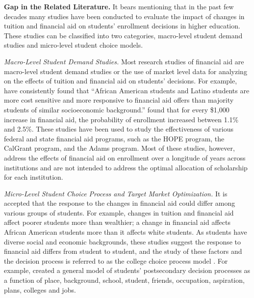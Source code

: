 \documentclass[12pt,english]{report}
\begin{document}

\vspace{0.15in}
\noindent \textbf{Gap in the Related Literature.} 
It bears mentioning that in the past few decades many studies have been conducted to evaluate the impact of changes in tuition and financial aid on students' enrollment decisions in higher education. These studies can be classified into two categories, macro-level student demand studies and micro-level student choice models. 

\vspace{0.1in}
\noindent \textit{Macro-Level Student Demand Studies.} 
Most research studies of financial aid are  macro-level student demand studies or the use of market level data for analyzing on the effects of tuition and financial aid on students' decisions.  For example, \citet{Hossler1989} have consistently found that ``African American students and Latino students are more cost sensitive and more responsive to financial aid offers than majority students of similar socioeconomic background.''  \citet{Braunstein1999} found that for every \$1,000 increase in financial aid, the probability  of  enrollment increased between 1.1\% and 2.5\%.  These studies have been used to study the effectiveness of various federal and state financial aid programs, such as the HOPE program, the CalGrant program, and the Adams program.  Most of these studies, however, address the effects of financial aid on enrollment over a longitude of years across institutions and are not intended to address the optimal  allocation of scholarship for each institution. 

\vspace{0.1in}
\noindent \textit{Micro-Level Student Choice Process and Target Market Optimization.} 
It is accepted that the response to the changes in financial aid could differ among various groups of students. For example, changes in tuition and financial aid affect poorer students more than wealthier; a change in financial aid affects African American students more than it affects white students. As students have diverse social and economic backgrounds, these studies suggest the response to financial aid differs from student to student, and the study of these factors and the decision process is referred  to as the college choice process model \citep{Paulsen1990}. For example, \citet{Jackson1978} created a general model of students' postsecondary decision processes as a function of place, background, school, student, friends, occupation, aspiration, plans, colleges and jobs.
\end{document}
